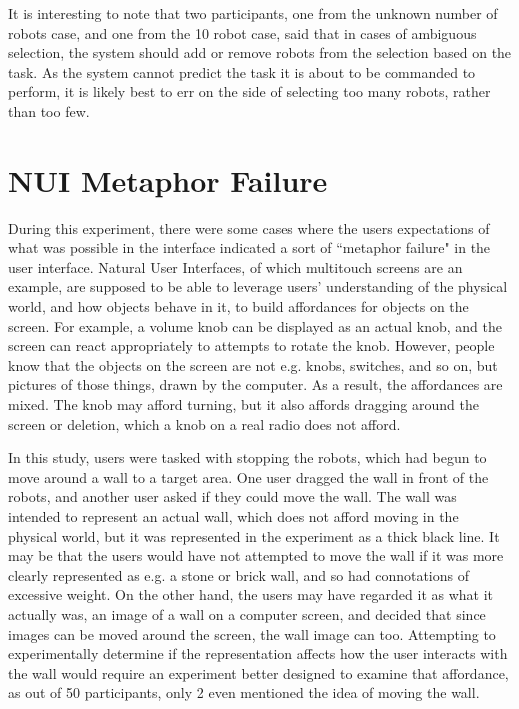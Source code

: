 It is interesting to note that two participants, one from the unknown number of robots case, and one from the 10 robot case, said that in cases of ambiguous selection, the system should add or remove robots from the selection based on the task. 
As the system cannot predict the task it is about to be commanded to perform, it is likely best to err on the side of selecting too many robots, rather than too few. 

\section{NUI Metaphor Failure}

During this experiment, there were some cases where the users expectations of what was possible in the interface indicated a sort of ``metaphor failure" in the user interface. 
Natural User Interfaces, of which multitouch screens are an example, are supposed to be able to leverage users' understanding of the physical world, and how objects behave in it, to build affordances for objects on the screen. 
For example, a volume knob can be displayed as an actual knob, and the screen can react appropriately to attempts to rotate the knob. 
However, people know that the objects on the screen are not e.g. knobs, switches, and so on, but pictures of those things, drawn by the computer. 
As a result, the affordances are mixed. 
The knob may afford turning, but it also affords dragging around the screen or deletion, which a knob on a real radio does not afford. 

In this study, users were tasked with stopping the robots, which had begun to move around a wall to a target area. 
One user dragged the wall in front of the robots, and another user asked if they could move the wall. 
The wall was intended to represent an actual wall, which does not afford moving in the physical world, but it was represented in the experiment as a thick black line. 
It may be that the users would have not attempted to move the wall if it was more clearly represented as e.g. a stone or brick wall, and so had connotations of excessive weight. 
On the other hand, the users may have regarded it as what it actually was, an image of a wall on a computer screen, and decided that since images can be moved around the screen, the wall image can too. 
Attempting to experimentally determine if the representation affects how the user interacts with the wall would require an experiment better designed to examine that affordance, as out of 50 participants, only 2 even mentioned the idea of moving the wall.
